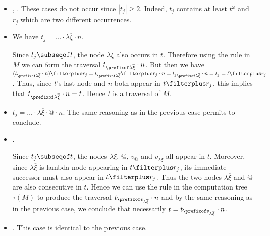   \begin{itemize}
    \item {}, . These cases do not occur since $|t_j| \geq 2$. Indeed, $t_j$ contains at least $t^\omega$ and $r_j$ which are two different occurrences.

    \item {}
        We have  $t_j = \ldots \cdot \lambda \overline{\xi} \cdot n$.

        Since $t_j \subseqof t$, the node $\lambda \overline{\xi}$ also occurs in $t$.
        Therefore using the rule  in $M$ we can form the traversal
        $t_{\prefixof \lambda \overline{\xi}} \cdot n$. But then we have $(t_{\prefixof \lambda \overline{\xi}} \cdot n) \filterplus r_j =
        t_{\prefixof \lambda \overline{\xi}} \filterplus r_j \cdot n
        = {t_j}_{\prefixof \lambda \overline{\xi}} \cdot n = t_j = t \filterplus r_j$.
        Thus, since $t$'s last node and $n$ both appear in $t\filterplus r_j$, this implies that
         $t_{\prefixof \lambda \overline{\xi}} \cdot n = t$.
        Hence $t$ is a traversal of $M$.

    \item {} $t_j = \ldots \cdot \lambda \overline{\xi} \cdot @ \cdot n$.
    The same reasoning as in the previous case permits to conclude.


    \item {} .

    Since $t_j\subseqof t$, the nodes
    $\lambda \overline{\xi}$, $@$, $v_@$ and $v_{\lambda \overline{\xi}}$
    all appear in $t$. Moreover, since $\lambda \overline{\xi}$ is lambda node
    appearing in $t\filterplus r_j$, its immediate successor must also appear in
    $t\filterplus r_j$. Thus the two nodes $\lambda \overline{\xi}$ and $@$ are also consecutive in $t$. Hence
    we can use the rule  in the computation tree $\tau(M)$ to produce
    the traversal $t_{\prefixof v_{\lambda \overline{\xi}}} \cdot n$ and by the same reasoning as in the previous case, we
    conclude that necessarily $t = t_{\prefixof v_{\lambda \overline{\xi}}} \cdot n$.

    \item {} . This case is identical to the previous case.


\end{itemize}
